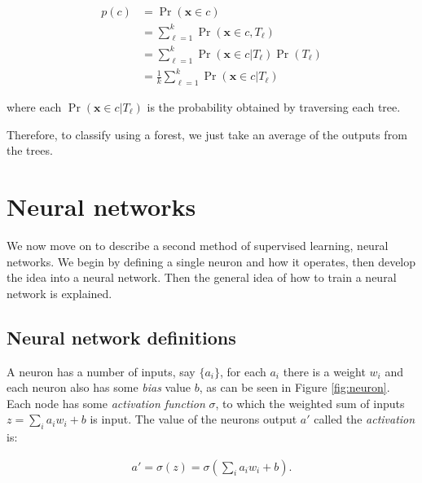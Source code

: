 \documentclass[12pt,twoside,notitlepage]{report}
\newcommand{\vc}[1]{\mathbf{#1}}
\begin{document}
            \begin{align}
                p(c) & = \Pr(\vc{x} \in c) \\
                    & = \sum_{\ell=1}^k \Pr(\vc{x} \in c, T_\ell) \\
                    & = \sum_{\ell=1}^k \Pr(\vc{x} \in c | T_\ell) \Pr(T_\ell) \\
                    & = \frac{1}{k} \sum_{\ell=1}^k \Pr(\vc{x} \in c | T_\ell)
            \end{align}

            where each $\Pr(\vc{x} \in c | T_\ell)$ is the probability obtained by traversing each tree. \cite{criminisi2013decision}

            Therefore, to classify using a forest, we just take an average of the outputs from the trees. 





    \section{Neural networks} \label{sec:neuralnetworkdef}
        We now move on to describe a second method of supervised learning, neural networks. We begin 
        by defining a single neuron and how it operates, then develop the idea into a neural network. Then the 
        general idea of how to train a neural network is explained.

            \subsection{Neural network definitions}

                A neuron has a number of inputs, say $\{a_i\}$, for each $a_i$ there is a weight $w_i$ and each neuron also has 
                some \textit{bias} value $b$, as can be seen in Figure \ref{fig:neuron}. Each node has some 
                \textit{activation function} $\sigma$, to which the weighted sum of inputs $z = \sum_{i} a_iw_i + b$ is input. 
                The value of the neurons output $a'$ called the \textit{activation} is:
                
                \begin{align}
                    a' = \sigma(z) = \sigma\left(\sum_i a_iw_i + b \right).
                \end{align}
\end{document}
